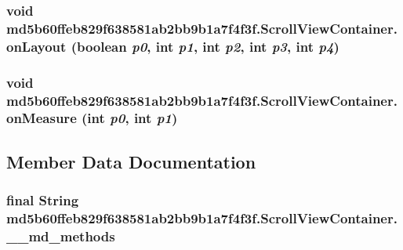 \hypertarget{classmd5b60ffeb829f638581ab2bb9b1a7f4f3f_1_1_scroll_view_container_14c4115a2131636e6b15e7327ded3d04}{
\subsubsection[{onLayout}]{\setlength{\rightskip}{0pt plus 5cm}void md5b60ffeb829f638581ab2bb9b1a7f4f3f.ScrollViewContainer.onLayout (boolean {\em p0}, \/  int {\em p1}, \/  int {\em p2}, \/  int {\em p3}, \/  int {\em p4})}}
\label{classmd5b60ffeb829f638581ab2bb9b1a7f4f3f_1_1_scroll_view_container_14c4115a2131636e6b15e7327ded3d04}


\hypertarget{classmd5b60ffeb829f638581ab2bb9b1a7f4f3f_1_1_scroll_view_container_31ed54d7d9fb3ae0c81c8582a15e49f4}{
\subsubsection[{onMeasure}]{\setlength{\rightskip}{0pt plus 5cm}void md5b60ffeb829f638581ab2bb9b1a7f4f3f.ScrollViewContainer.onMeasure (int {\em p0}, \/  int {\em p1})}}
\label{classmd5b60ffeb829f638581ab2bb9b1a7f4f3f_1_1_scroll_view_container_31ed54d7d9fb3ae0c81c8582a15e49f4}




\subsection{Member Data Documentation}
\hypertarget{classmd5b60ffeb829f638581ab2bb9b1a7f4f3f_1_1_scroll_view_container_dc93a3ae5f695e40173e7b339124ed69}{
\subsubsection[{\_\-\_\-md\_\-methods}]{\setlength{\rightskip}{0pt plus 5cm}final String {\bf md5b60ffeb829f638581ab2bb9b1a7f4f3f.ScrollViewContainer.\_\-\_\-md\_\-methods}}}
\label{classmd5b60ffeb829f638581ab2bb9b1a7f4f3f_1_1_scroll_view_container_dc93a3ae5f695e40173e7b339124ed69}


